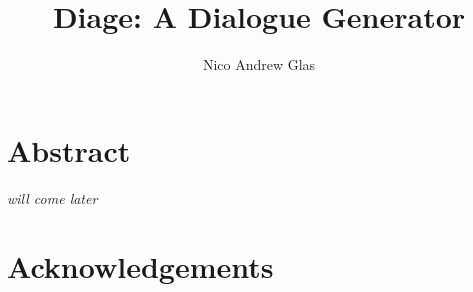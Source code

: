 \documentclass[12pt,a4paper,onecolumn,titlepage]{book}
\author{Nico Andrew Glas}
\title{Diage: A Dialogue Generator}
\begin{document}
\maketitle
\chapter*{Abstract}
\textit{will come later}\cite{Cavazza:2002:CIS:630325.630747} \cite{Greimas:Boydstun:90} \cite{Magerko:2004:ACD:1597321.1597339} \cite{Porteous:2009:CNG:1695522.1695557} \cite{Weyhrauch:1997:GID:925491} \cite{Riedl03character-focusednarrative} \cite{Riedl:2003:MIU:860575.860694} \cite{Riedl:2004:IPM:1018409.1018753} \cite{Sgouros199929}

\chapter*{Acknowledgements}
\tableofcontents










\end{document}
